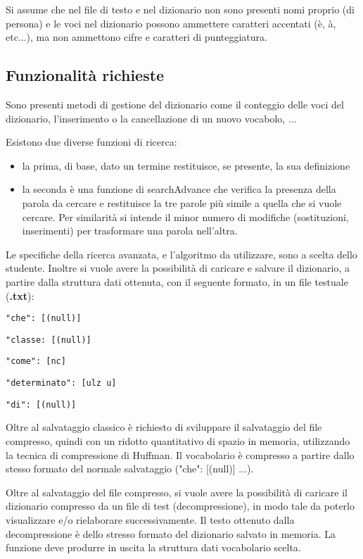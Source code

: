 \documentclass[paper=a4, fontsize=11pt,twoside]{scrartcl}   %
\begin{document}
				Si assume che nel file di testo e nel dizionario non sono presenti nomi proprio (di persona) e le voci nel dizionario possono ammettere caratteri accentati (è, à, etc...), ma non ammettono cifre e caratteri di punteggiatura.
			
			\subsection{Funzionalità richieste}
				Sono presenti metodi di gestione del dizionario come il conteggio delle voci del dizionario, l'inserimento o la cancellazione di un nuovo vocabolo, ...
				
				Esistono due diverse funzioni di ricerca:
				\begin{itemize}
					\item la prima, di base, dato un termine restituisce, se presente, la sua definizione
					\item la seconda è una funzione di searchAdvance che verifica la presenza della parola da cercare e restituisce la tre parole più simile a quella che si vuole cercare. Per similarità si intende il minor numero di modifiche (sostituzioni, inserimenti) per trasformare una parola nell'altra.
				\end{itemize} \newpage			
				 Le specifiche della ricerca avanzata, e l'algoritmo da utilizzare, sono a scelta dello studente. Inoltre si vuole avere la possibilità di caricare e salvare il dizionario, a partire dalla struttura dati ottenuta, con il seguente formato, in un file testuale (\textbf{.txt}):
				 \begin{trivlist}
				 	\item \texttt{"che": [(null)]}
				 	\item \texttt{"classe: [(null)]}
				 	\item \texttt{"come": [nc]}
				 	\item \texttt{"determinato": [ulz u]}
				 	\item \texttt{"di": [(null)]}
				 \end{trivlist}
			 	 Oltre al salvataggio classico è richiesto di sviluppare il salvataggio del file compresso, quindi con un ridotto quantitativo di spazio in memoria, utilizzando la tecnica di compressione di Huffman. Il vocabolario è compresso a partire dallo stesso formato del normale salvataggio ("che": [(null)] ...). 
			 	 
			 	 Oltre al salvataggio del file compresso, si vuole avere la possibilità di caricare il dizionario compresso da un file di test (decompressione), in modo tale da poterlo visualizzare e/o rielaborare successivamente. Il testo ottenuto dalla decompressione è dello stresso formato del dizionario salvato in memoria. La funzione deve produrre in uscita la struttura dati vocabolario scelta.
			 	 \newpage
\end{document}
